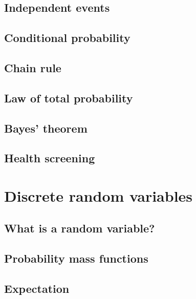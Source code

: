 \documentclass[
  a4paper,
]{book}
\theoremstyle{definition}
\theoremstyle{definition}
\theoremstyle{definition}
\theoremstyle{remark}
\begin{document}
\hypertarget{independent-events}{%
\section{Independent events}\label{independent-events}}

\hypertarget{conditional}{%
\section{Conditional probability}\label{conditional}}

\hypertarget{chain-rule}{%
\section{Chain rule}\label{chain-rule}}

\hypertarget{total-prob}{%
\section{Law of total probability}\label{total-prob}}

\hypertarget{bayes}{%
\section{Bayes' theorem}\label{bayes}}

\hypertarget{screening}{%
\section{Health screening}\label{screening}}

\hypertarget{S05-discrete-rv}{%
\chapter{Discrete random variables}\label{S05-discrete-rv}}

\hypertarget{rv}{%
\section{What is a random variable?}\label{rv}}

\hypertarget{pmf}{%
\section{Probability mass functions}\label{pmf}}

\hypertarget{expectation}{%
\section{Expectation}\label{expectation}}
\end{document}

